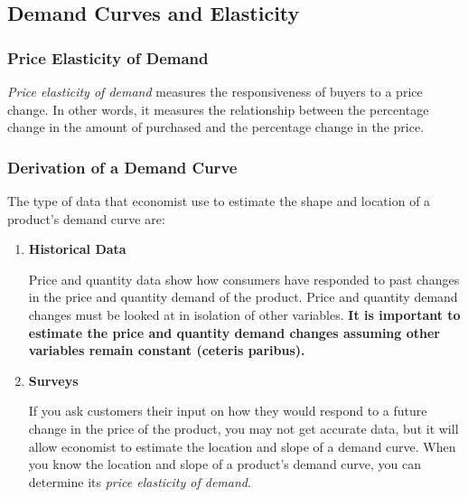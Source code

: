 \documentclass[a4paper, 12pt] {article}
\begin{document}
\subsection{Demand Curves and Elasticity}
\subsubsection{Price Elasticity of Demand}
\emph{Price elasticity of demand} measures the responsiveness of buyers to a
price change. In other words, it measures the relationship between the percentage
change in the amount of purchased and the percentage change in the price.

\subsubsection{Derivation of a Demand Curve}
The type of data that economist use to estimate the shape and location of a
product's demand curve are:
\begin{enumerate}
    \item \textbf{Historical Data}

        Price and quantity data show how consumers have responded to past changes
        in the price and quantity demand of the product. Price and quantity demand
        changes must be looked at in isolation of other variables. \textbf{It is
        important to estimate the price and quantity demand changes assuming
        other variables remain constant (ceteris paribus).}
    \item \textbf{Surveys}

        If you ask customers their input on how they would respond to a future
        change in the price of the product, you may not get accurate data, but
        it will allow economist to estimate the location and slope of a demand
        curve. When you know the location and slope of a product's demand curve,
        you can determine its \emph{price elasticity of demand}.
\end{enumerate}
\end{document}
